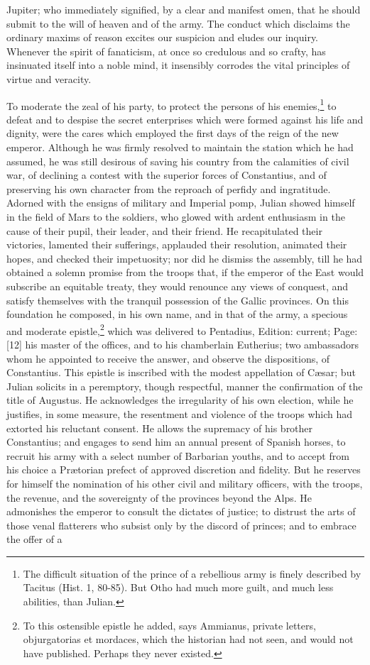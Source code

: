 Jupiter; who immediately signified, by a clear and manifest omen, that he should submit to the will of heaven and of the army. The conduct which disclaims the ordinary maxims of reason excites our suspicion and eludes our inquiry. Whenever the spirit of fanaticism, at once so credulous and so crafty, has insinuated itself into a noble mind, it insensibly corrodes the vital principles of virtue and veracity.

To moderate the zeal of his party, to protect the persons of his enemies,\footnote{The difficult situation of the prince of a rebellious army is finely described by Tacitus (Hist. 1, 80-85). But Otho had much more guilt, and much less abilities, than Julian.} to defeat and to despise the secret enterprises which were formed against his life and dignity, were the cares which employed the first days of the reign of the new emperor. Although he was firmly resolved to maintain the station which he had assumed, he was still desirous of saving his country from the calamities of civil war, of declining a contest with the superior forces of Constantius, and of preserving his own character from the reproach of perfidy and ingratitude. Adorned with the ensigns of military and Imperial pomp, Julian showed himself in the field of Mars to the soldiers, who glowed with ardent enthusiasm in the cause of their pupil, their leader, and their friend. He recapitulated their victories, lamented their sufferings, applauded their resolution, animated their hopes, and checked their impetuosity; nor did he dismiss the assembly, till he had obtained a solemn promise from the troops that, if the emperor of the East would subscribe an equitable treaty, they would renounce any views of conquest, and satisfy themselves with the tranquil possession of the Gallic provinces. On this foundation he composed, in his own name, and in that of the army, a specious and moderate epistle,\footnote{To this ostensible epistle he added, says Ammianus, private letters, objurgatorias et mordaces, which the historian had not seen, and would not have published. Perhaps they never existed.} which was delivered to Pentadius, Edition: current; Page: [12] his master of the offices, and to his chamberlain Eutherius; two ambassadors whom he appointed to receive the answer, and observe the dispositions, of Constantius. This epistle is inscribed with the modest appellation of Cæsar; but Julian solicits in a peremptory, though respectful, manner the confirmation of the title of Augustus. He acknowledges the irregularity of his own election, while he justifies, in some measure, the resentment and violence of the troops which had extorted his reluctant consent. He allows the supremacy of his brother Constantius; and engages to send him an annual present of Spanish horses, to recruit his army with a select number of Barbarian youths, and to accept from his choice a Prætorian prefect of approved discretion and fidelity. But he reserves for himself the nomination of his other civil and military officers, with the troops, the revenue, and the sovereignty of the provinces beyond the Alps. He admonishes the emperor to consult the dictates of justice; to distrust the arts of those venal flatterers who subsist only by the discord of princes; and to embrace the offer of a 